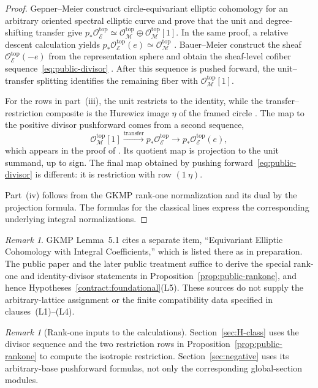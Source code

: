 \documentclass[11pt,a4paper]{amsart}
\newcommand{\cM}{\mathcal M}
\newcommand{\cE}{\mathcal E}
\newcommand{\cO}{\mathcal O}
\theoremstyle{plain}
\theoremstyle{definition}
\theoremstyle{remark}
\newtheorem{remark}[theorem]{Remark}
\begin{document}
\begin{proof}
Gepner--Meier construct circle-equivariant elliptic cohomology for
an arbitrary oriented spectral elliptic curve and prove that the
unit and degree-shifting transfer give
$p_*\cO_{\cE}^{\mathrm{top}}\simeq\cO_{\cM}^{\mathrm{top}}\oplus\cO_{\cM}^{\mathrm{top}}[1]$.
In the same proof, a relative descent calculation yields
$p_*\cO_{\cE}^{\mathrm{top}}(e)\simeq\cO_{\cM}^{\mathrm{top}}$
\cite[Theorem~10.1]{GM23}. Bauer--Meier construct the sheaf
$\cO_{\cE}^{\mathrm{top}}(-e)$ from the representation sphere and
obtain the sheaf-level cofiber sequence~\eqref{eq:public-divisor}
\cite[Theorem~3.1 and (3.2)]{BM25}. After this sequence is pushed
forward, the unit--transfer splitting identifies the remaining
fiber with $\cO_{\cM}^{\mathrm{top}}[1]$.

For the rows in part~\textup{(iii)}, the unit restricts to the
identity, while the transfer--restriction composite is the
Hurewicz image $\eta$ of the framed circle
\cite[(3.8)--(3.9)]{BM25}. The map to the positive divisor
pushforward comes from a second sequence,
\[
 \cO_{\cM}^{\mathrm{top}}[1]\xrightarrow{\mathrm{transfer}}
 p_*\cO_{\cE}^{\mathrm{top}}\longrightarrow
 p_*\cO_{\cE}^{\mathrm{top}}(e),
\]
which appears in the proof of \cite[Theorem~10.1, equation (7)]{GM23}.
Its quotient map is projection to the unit summand, up to sign.
The final map obtained by pushing forward~\eqref{eq:public-divisor}
is different: it is restriction with row $(1\ \eta)$.

Part~\textup{(iv)} follows from the GKMP rank-one normalization and
its dual by the projection formula. The formulas for the
classical lines express the corresponding underlying integral
normalizations.
\end{proof}

\begin{remark}\label{rem:GM-status}
GKMP Lemma~5.1 cites a separate item, ``Equivariant Elliptic
Cohomology with Integral Coefficients,'' which is listed there as
in preparation. The public paper \cite{GM23} and the later public
treatment \cite{BM25} suffice to derive the special rank-one and
identity-divisor statements in Proposition~\ref{prop:public-rankone},
and hence Hypotheses~\ref{contract:foundational}\textup{(L5)}.
These sources do not supply the arbitrary-lattice assignment or
the finite compatibility data specified in
clauses~\textup{(L1)--(L4)}.
\end{remark}

\begin{remark}[Rank-one inputs to the calculations]\label{rem:L5-redundancy}
Section~\ref{sec:H-class} uses the divisor sequence and the two
restriction rows in Proposition~\ref{prop:public-rankone} to
compute the isotropic restriction. Section~\ref{sec:negative}
uses its arbitrary-base pushforward formulas, not only the
corresponding global-section modules.
\end{remark}
\end{document}
